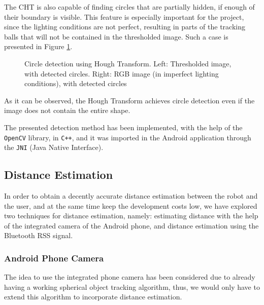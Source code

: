 \documentclass[journal]{IEEEtran}
\let\MYoriglatexcaption\caption
\renewcommand{\caption}[2][\relax]{\MYoriglatexcaption[#2]{#2}}
\begin{document}
The CHT is also capable of finding circles that are partially hidden, if enough of their boundary is visible. This feature is especially important for the project, since the lighting conditions are not perfect, resulting in parts of the tracking balls that will not be contained in the thresholded image. Such a case is presented in Figure \ref{fig:cht}.
\begin{figure}[!htpb]
\centering
\caption{Circle detection using Hough Transform. Left: Thresholded image, with detected circles. Right: RGB image (in imperfect lighting conditions), with detected circles}
\label{fig:cht}
\end{figure}

As it can be observed, the Hough Transform achieves circle detection even if the image does not contain the entire shape.

The presented detection method has been implemented, with the help of the \texttt{OpenCV} library, in \texttt{C++}, and it was imported in the Android application through the \texttt{JNI} (Java Native Interface).

\subsection{Distance Estimation}
In order to obtain a decently accurate distance estimation between the robot and the user, and at the same time keep the development costs low, we have explored two techniques for distance estimation, namely: estimating distance with the help of the integrated camera of the Android phone, and distance estimation using the Bluetooth RSS signal.

\subsubsection{Android Phone Camera}
The idea to use the integrated phone camera has been considered due to already having a working spherical object tracking algorithm, thus, we would only have to extend this algorithm to incorporate distance estimation.
\end{document}
